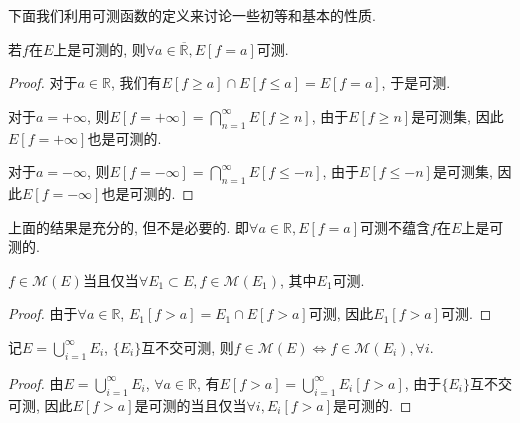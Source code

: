 \documentclass[theorem=false,mathfont=none,openany,sub3section]{easybook}
\begin{document}
下面我们利用可测函数的定义来讨论一些初等和基本的性质.\par

\begin{proposition}
  若$f$在$E$上是可测的, 则$\forall a\in \overline{\mathbb{R}}, E[f=a]$可测.\par
\end{proposition}

\begin{proof}
  对于$a \in \mathbb{R}$, 我们有$E[f\geqslant a]\cap E[f\leqslant a]=E[f=a]$, 于是可测.\par
  对于$a = +\infty$, 则$E[f=+\infty]=\bigcap_{n=1}^{\infty}E[f\geqslant n]$, 由于$E[f\geqslant n]$是可测集, 因此$E[f=+\infty]$也是可测的.\par
  对于$a = -\infty$, 则$E[f=-\infty]=\bigcap_{n=1}^{\infty}E[f\leqslant -n]$, 由于$E[f\leqslant -n]$是可测集, 因此$E[f=-\infty]$也是可测的.\par
\end{proof}

\begin{remark}
  上面的结果是充分的, 但不是必要的. 即$\forall a \in \mathbb{R}, E[f=a]$可测不蕴含$f$在$E$上是可测的.\par
\end{remark}

\begin{proposition}
  $f\in \mathcal{M}(E)$当且仅当$\forall E_1\subset E, f\in \mathcal{M}(E_1)$, 其中$E_1$可测.\par
\end{proposition}

\begin{proof}
  由于$\forall a \in \mathbb{R}$, $E_1[f>a]=E_1\cap E[f>a]$可测, 因此$E_1[f>a]$可测.\par
\end{proof}

\begin{proposition}
  记$E=\bigcup_{i=1}^{\infty}E_i$, $\{E_i\}$互不交可测, 则$f\in \mathcal{M}(E)\Leftrightarrow f\in \mathcal{M}(E_i), \forall i$.\par
\end{proposition}

\begin{proof}
  由$E=\bigcup_{i=1}^{\infty}E_i$, $\forall a \in \mathbb{R}$, 有$E[f>a]=\bigcup_{i=1}^{\infty}E_i[f>a]$, 由于$\{E_i\}$互不交可测, 因此$E[f>a]$是可测的当且仅当$\forall i, E_i[f>a]$是可测的.\par
\end{proof}
\end{document}
